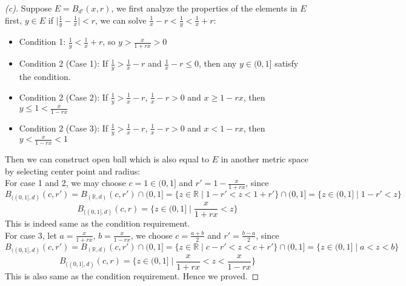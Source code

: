\begin{proof}[(c)]
    Suppose $E = B_{d'}(x, r)$, we first analyze the properties of the elements in $E$ first, $y \in E$ if $\lvert \frac{1}{y} - \frac{1}{x} \rvert < r$, we can solve $\frac{1}{x} - r < \frac{1}{y} < \frac{1}{x} + r$:
    \begin{itemize}
        \item Condition 1: $\frac{1}{y} < \frac{1}{x} +r$, so $y > \frac{x}{1+rx} > 0$
        \item Condition 2 (Case 1): If $\frac{1}{y} > \frac{1}{x} - r$ and $\frac{1}{x} - r \leq 0$, then any $y \in (0,1]$ satisfy the condition.
        \item Condition 2 (Case 2): If $\frac{1}{y} > \frac{1}{x} - r$, $\frac{1}{x} - r > 0$ and $x \geq 1-rx$, then $y \leq 1 < \frac{x}{1-rx}$
        \item Condition 2 (Case 3): If $\frac{1}{y} > \frac{1}{x} - r$, $\frac{1}{x} - r > 0$ and $x < 1-rx$, then $y < \frac{x}{1-rx} < 1$
    \end{itemize}
    Then we can construct open ball which is also equal to $E$ in another metric space by selecting center point and radius:\\
    For case 1 and 2, we may choose $c = 1 \in (0,1]$ and $r' = 1 - \frac{x}{1+rx}$, since
    \[
    B_{((0,1],d)}(c,r') = B_{(\mathbb{R},d)}(c,r') \cap (0,1] = \{ z \in \mathbb{R} \mid 1-r' < z < 1+r' \} \cap (0,1] = \{ z \in (0,1] \mid 1-r' < z\}
    \]
    \[
    B_{((0,1],d)}(c,r) = \{ z \in (0,1] \mid \frac{x}{1+rx} < z\}
    \]
    This is indeed same as the condition requirement.\\
    For case 3, let $a = \frac{x}{1+rx}$, $b = \frac{x}{1-rx}$, we choose $c = \frac{a+b}{2}$ and $r' = \frac{b-a}{2}$, since
    \[
    B_{((0,1],d)}(c,r') = B_{(\mathbb{R},d)}(c,r') \cap (0,1] = \{ z \in \mathbb{R} \mid c-r' < z < c+r' \} \cap (0,1] = \{ z \in (0,1] \mid a < z < b\}
    \]
    \[
    B_{((0,1],d)}(c,r) = \{ z \in (0,1] \mid \frac{x}{1+rx} < z < \frac{x}{1-rx}\}
    \]
    This is also same as the condition requirement.
    Hence we proved.
    
\end{proof}

